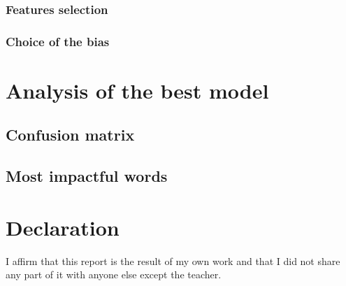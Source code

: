 \documentclass{class}
\begin{document}
\subsubsection*{Features selection}
\subsubsection*{Choice of the bias}
\section{Analysis of the best model}
\subsection{Confusion matrix}
\subsection{Most impactful words}

\pagestyle{OtherPage}

\section{Declaration}
I affirm that this report is the result of my own work and that I did not share any part of it with anyone
else except the teacher.
\end{document}
